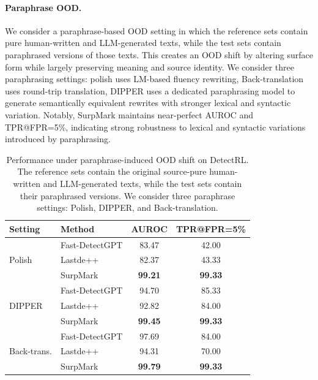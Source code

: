 \documentclass{article}
\theoremstyle{plain}
\theoremstyle{definition}
\theoremstyle{remark}
\begin{document}
\paragraph{Paraphrase OOD. }
We consider a paraphrase-based OOD setting in which the reference sets contain pure human-written and LLM-generated texts, while the test sets contain paraphrased versions of those texts. This creates an OOD shift by altering surface form while largely preserving meaning and source identity. We consider three paraphrasing settings: polish uses LM-based fluency rewriting, Back-translation uses round-trip translation, DIPPER uses a dedicated paraphrasing model to generate semantically equivalent rewrites with stronger lexical and syntactic variation. Notably, SurpMark maintains near-perfect AUROC and TPR@FPR=5\%, indicating strong robustness to lexical and syntactic variations introduced by paraphrasing.
\begin{table}[t]
\centering
\scriptsize
\caption{Performance under paraphrase-induced OOD shift on DetectRL. The reference sets contain the original source-pure human-written and LLM-generated texts, while the test sets contain their paraphrased versions. We consider three paraphrase settings: Polish, DIPPER, and Back-translation.}
\label{table:paraphrase_ood}
\begin{tabular}{llcc}
\toprule
Setting & Method & AUROC & TPR@FPR=5\% \\
\midrule
\multirow{3}{*}{Polish}
& Fast-DetectGPT & 83.47 & 42.00 \\
& Lastde++ & 82.37 & 43.33 \\
& \cellcolor{ours}SurpMark & \cellcolor{ours}\textbf{99.21} & \cellcolor{ours}\textbf{99.33} \\
\midrule
\multirow{3}{*}{DIPPER}
& Fast-DetectGPT & 94.70 & 85.33 \\
& Lastde++ & 92.82 & 84.00 \\
& \cellcolor{ours}SurpMark & \cellcolor{ours}\textbf{99.45} & \cellcolor{ours}\textbf{99.33} \\
\midrule
\multirow{3}{*}{Back-trans.}
& Fast-DetectGPT & 97.69 & 84.00 \\
& Lastde++ & 94.31 & 70.00 \\
& \cellcolor{ours}SurpMark & \cellcolor{ours}\textbf{99.79} & \cellcolor{ours}\textbf{99.33} \\
\bottomrule
\end{tabular}
\end{table}
\end{document}
